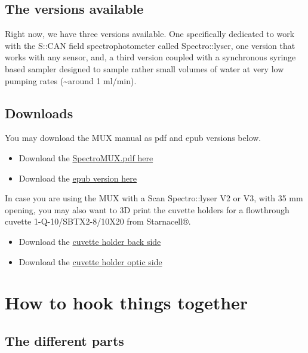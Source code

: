 \documentclass[]{book}
\begin{document}
\hypertarget{the-versions-available}{%
\section{The versions available}\label{the-versions-available}}

Right now, we have three versions available. One specifically dedicated to work with the S::CAN field spectrophotometer called Spectro::lyser, one version that works with any sensor, and, a third version coupled with a synchronous syringe based sampler designed to sample rather small volumes of water at very low pumping rates (\textasciitilde{}around 1 ml/min).

\hypertarget{downloads}{%
\section{Downloads}\label{downloads}}

You may download the MUX manual as pdf and epub versions below.

\begin{itemize}
\item
  Download the \href{https://francoisbirgand.github.io/Multiplexo/MUXManual.pdf}{SpectroMUX.pdf here}
\item
  Download the \href{https://francoisbirgand.github.io/Multiplexo/MUXManual.epub}{epub version here}
\end{itemize}

In case you are using the MUX with a Scan Spectro::lyser V2 or V3, with 35 mm opening, you may also want to 3D print the cuvette holders for a flowthrough cuvette 1-Q-10/SBTX2-8/10X20 from Starnacell®.

\begin{itemize}
\item
  Download the \href{https://francoisbirgand.github.io/Multiplexo/pictures/cuvette_holder_back_side.stl}{cuvette holder back side}
\item
  Download the \href{https://francoisbirgand.github.io/Multiplexo/pictures/cuvette_holder_optics_side.stl}{cuvette holder optic side}
\end{itemize}

\hypertarget{intro}{%
\chapter{How to hook things together}\label{intro}}

\hypertarget{the-different-parts}{%
\section{The different parts}\label{the-different-parts}}
\end{document}
